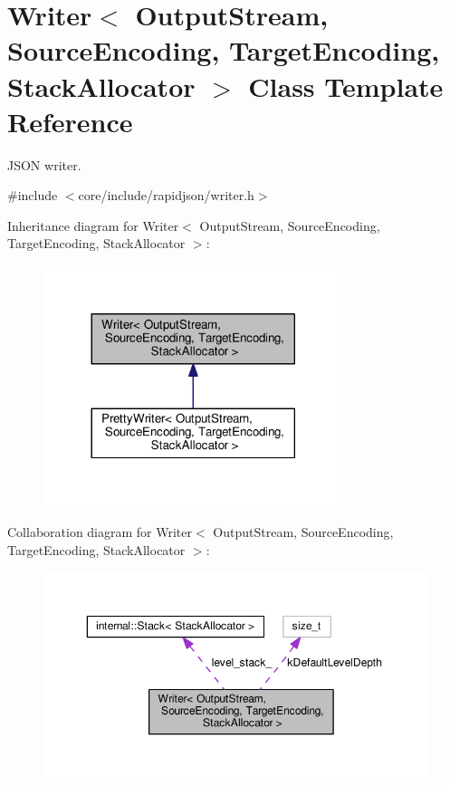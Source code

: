 \hypertarget{classWriter}{}\section{Writer$<$ Output\+Stream, Source\+Encoding, Target\+Encoding, Stack\+Allocator $>$ Class Template Reference}
\label{classWriter}


J\+S\+ON writer.  




{\ttfamily \#include $<$core/include/rapidjson/writer.\+h$>$}



Inheritance diagram for Writer$<$ Output\+Stream, Source\+Encoding, Target\+Encoding, Stack\+Allocator $>$\+:
\nopagebreak
\begin{figure}[H]
\begin{center}
\leavevmode
\includegraphics[width=248pt]{classWriter__inherit__graph}
\end{center}
\end{figure}


Collaboration diagram for Writer$<$ Output\+Stream, Source\+Encoding, Target\+Encoding, Stack\+Allocator $>$\+:
\nopagebreak
\begin{figure}[H]
\begin{center}
\leavevmode
\includegraphics[width=350pt]{classWriter__coll__graph}
\end{center}
\end{figure}

